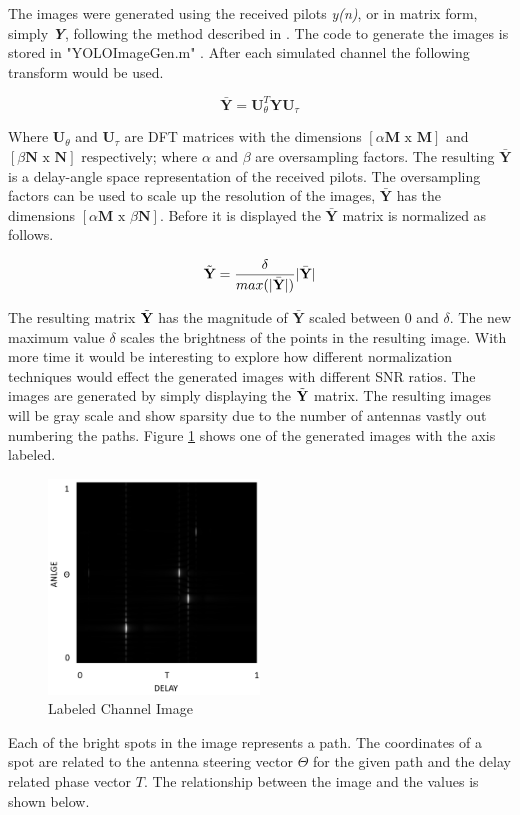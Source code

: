 The images were generated using the received pilots \textit{y(n)}, or in matrix form, simply  \textit{\textbf{Y}}, following the method described in \cite{Li2020}. The code to generate the images is stored in "YOLOImageGen.m" \cite{git}. After each simulated channel the following transform would be used. 

\[
    \bar{\textbf{Y}} = \textbf{U}_{\theta}^{T}  \textbf{Y} \textbf{U}_{\tau}
\]

\noindent 
Where \(\textbf{U}_{\theta}\) and \(\textbf{U}_{\tau}\) are DFT matrices with the dimensions \([\alpha \textbf{M} \text{ x } \textbf{M}]\) and \([\beta \textbf{N} \text{ x } \textbf{N}]\) respectively; where \(\alpha\) and \(\beta\) are oversampling factors. The resulting \(\bar{\textbf{Y}}\) is a delay-angle space representation of the received pilots. The oversampling factors can be used to scale up the resolution of the images, \(\bar{\textbf{Y}}\) has the dimensions \([\alpha \textbf{M} \text{ x } \beta \textbf{N}]\). Before it is displayed the \(\bar{\textbf{Y}}\) matrix is normalized as follows. 

\[
    \Tilde{\textbf{Y}} = \dfrac{\delta}{max(|\bar{\textbf{Y}}|)} |\bar{\textbf{Y}}|
\] 

\noindent 
The resulting matrix \(\Tilde{\textbf{Y}}\) has the magnitude of \(\bar{\textbf{Y}}\) scaled between 0 and \(\delta\). The new maximum value \(\delta\) scales the brightness of the points in the resulting image. With more time it would be interesting to explore how different normalization techniques would effect the generated images with different SNR ratios. The images are generated by simply displaying the  \(\Tilde{\textbf{Y}}\) matrix. The resulting images will be gray scale and show sparsity due to the number of antennas vastly out numbering the paths. Figure \ref{fig:labeledCh} shows one of the generated images with the axis labeled.
\begin{figure}[H]
\centering
\includegraphics[width=0.5\textwidth]{figures/SYSC5804_Labeled_ChImage.png}
\caption{Labeled Channel Image}
\label{fig:labeledCh}
\end{figure}
\noindent
Each of the bright spots in the image represents a path. The coordinates of a spot are related to the antenna steering vector \(\Theta\) for the given path and the delay related phase vector \(T\). The relationship between the image and the values is shown below.


